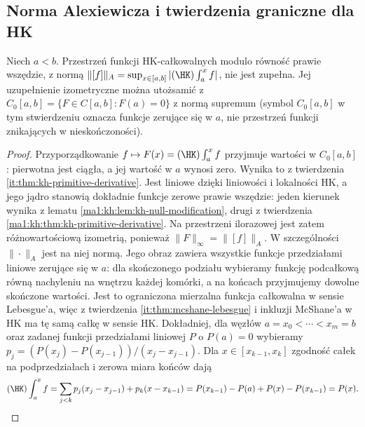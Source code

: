\subsection{Norma Alexiewicza i twierdzenia graniczne dla HK}
\begin{stwierdzenie}\label{it:thm:alexiewicz-completion}
Niech $a<b$. Przestrzeń funkcji HK-całkowalnych modulo równość prawie wszędzie, z normą $\|[f]\|_A=\sup_{x\in[a,b]}|(\HK)\int_a^x f|$, nie jest zupełna. Jej uzupełnienie izometryczne można utożsamić z $C_0[a,b]=\{F\in C[a,b]:F(a)=0\}$ z normą supremum (symbol $C_0[a,b]$ w tym stwierdzeniu oznacza funkcje zerujące się w $a$, nie przestrzeń funkcji znikających w nieskończoności).
\end{stwierdzenie}
\begin{proof}
Przyporządkowanie $f\mapsto F(x)=(\HK)\int_a^x f$ przyjmuje wartości w $C_0[a,b]$: pierwotna jest ciągła, a jej wartość w $a$ wynosi zero. Wynika to z twierdzenia \ref{it:thm:kh-primitive-derivative}. Jest liniowe dzięki liniowości i lokalności HK, a jego jądro stanowią dokładnie funkcje zerowe prawie wszędzie: jeden kierunek wynika z lematu \ref{ma1:kh:lem:kh-null-modification}, drugi z twierdzenia \ref{ma1:kh:thm:kh-primitive-derivative}. Na przestrzeni ilorazowej jest zatem różnowartościową izometrią, ponieważ $\|F\|_\infty=\|[f]\|_A$. W szczególności $\|\cdot\|_A$ jest na niej normą. Jego obraz zawiera wszystkie funkcje przedziałami liniowe zerujące się w $a$: dla skończonego podziału wybieramy funkcję podcałkową równą nachyleniu na wnętrzu każdej komórki, a na końcach przyjmujemy dowolne skończone wartości. Jest to ograniczona mierzalna funkcja całkowalna w sensie Lebesgue'a, więc z twierdzenia \ref{it:thm:mcshane-lebesgue} i inkluzji McShane'a w HK ma tę samą całkę w sensie HK. Dokładniej, dla węzłów $a=x_0<\cdots<x_m=b$ oraz zadanej funkcji przedziałami liniowej $P$ o $P(a)=0$ wybieramy $p_j=(P(x_j)-P(x_{j-1}))/(x_j-x_{j-1})$. Dla $x\in[x_{k-1},x_k]$ zgodność całek na podprzedziałach i zerowa miara końców dają
\[
 (\HK)\int_a^x f
 =\sum_{j<k}p_j(x_j-x_{j-1})+p_k(x-x_{k-1})
 =P(x_{k-1})-P(a)+P(x)-P(x_{k-1})=P(x).
\]

\end{proof}
